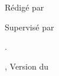 \vspace*{\fill}%
\begin{center}
\vspace*{\fill}%
\makebox[\linewidth]{\HRule} %
\parbox[t]{\textwidth}{\addvspace{\parskip} %
\centering\huge\bfseries\thetitle}
 \null%
\vspace*{\parskip}
\makebox[\linewidth]{\HRule}
\vspace*{\fill}
\diagdenomb*
\vspace{\fill}
\par \Large Rédigé par \theauthor\par Supervisé par \thesupervisor \par
\vspace*{\fill}
\large{\theyearname.\par \theuniversity, Version du \thedate}
\end{center}
\restoregeometry
